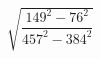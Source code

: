 \begin{ex}[type=calculate]
	\begin{condition}
		\( \sqrt{\dfrac{149^2-76^2}{457^2-384^2}} \)
	\end{condition}
\end{ex}
